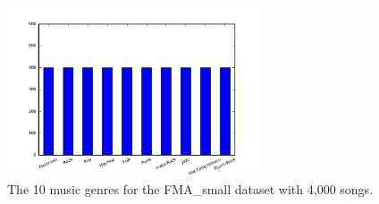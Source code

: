 \documentclass{article}
\begin{document}
\begin{figure}[h!]
\centering
\includegraphics[height=5cm]{histo_small.pdf}
\vspace{-0.5cm}
\caption{The 10 music genres for the FMA\_small dataset with 4,000 songs.}
\label{fig_small}
\end{figure}
\end{document}
